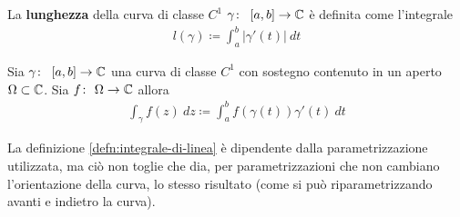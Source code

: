 \begin{definition}
	\label{defn:lunghezza-di-curva-classe-c1}
	La \textbf{lunghezza} della curva di classe $C^1$ $\gamma \colon\ \left[a,b\right] \rightarrow \mathbb{C}$ è definita come l'integrale 
	\begin{equation*}
	\begin{aligned}
	l(\gamma) \coloneqq \int_{a}^{b} |\gamma'(t)|\ dt
	\end{aligned}
	\end{equation*}
\end{definition}

\begin{definition}
	\label{defn:integrale-di-linea}
	Sia $\gamma \colon\ \left[a,b\right] \rightarrow \mathbb{C}$ una curva di classe $C^1$ con sostegno contenuto in un aperto $\Omega \subset \mathbb{C}$. Sia $f \colon\ \Omega \rightarrow \mathbb{C}$ allora
	\begin{equation*}
	\begin{aligned}
	\int_\gamma f(z)\ dz \coloneqq \int_{a}^b f(\gamma(t)) \gamma'(t) \ dt
	\end{aligned}
	\end{equation*}  
\end{definition}

\begin{remark}
	La definizione \ref{defn:integrale-di-linea} è dipendente dalla parametrizzazione utilizzata, ma ciò non toglie che dia, per parametrizzazioni che non cambiano l'orientazione della curva, lo stesso risultato (come si può riparametrizzando avanti e indietro la curva).
\end{remark}

